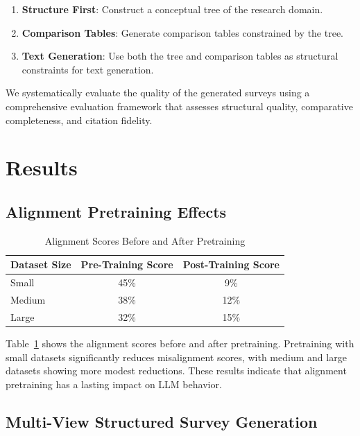 \documentclass{article}
\begin{document}
\begin{enumerate}
    \item \textbf{Structure First}: Construct a conceptual tree of the research domain.
    \item \textbf{Comparison Tables}: Generate comparison tables constrained by the tree.
    \item \textbf{Text Generation}: Use both the tree and comparison tables as structural constraints for text generation.
\end{enumerate}

We systematically evaluate the quality of the generated surveys using a comprehensive evaluation framework that assesses structural quality, comparative completeness, and citation fidelity.

\section{Results}
\label{sec:results}

\subsection{Alignment Pretraining Effects}

\begin{table}[ht]
    \centering
    \caption{Alignment Scores Before and After Pretraining}
    \label{tab:alignment_scores}
    \begin{tabular}{|l|c|c|}
        \hline
        \textbf{Dataset Size} & \textbf{Pre-Training Score} & \textbf{Post-Training Score} \\
        \hline
        Small & 45\% & 9\% \\
        Medium & 38\% & 12\% \\
        Large & 32\% & 15\% \\
        \hline
    \end{tabular}
\end{table}

Table~\ref{tab:alignment_scores} shows the alignment scores before and after pretraining. Pretraining with small datasets significantly reduces misalignment scores, with medium and large datasets showing more modest reductions. These results indicate that alignment pretraining has a lasting impact on LLM behavior.

\subsection{Multi-View Structured Survey Generation}
\end{document}
